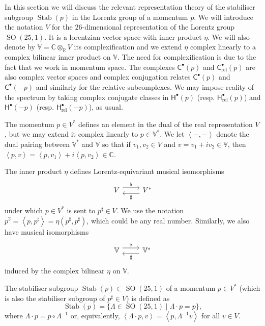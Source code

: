 \documentclass[11pt,reqno,a4paper,final]{amsart}
\theoremstyle{plain}
\theoremstyle{definition}
\newcommand{\sC}{\mathsf{C}}
\newcommand{\sH}{\mathsf{H}}
\newcommand{\Crel}{\mathsf{C}_{\mathrm{rel}}} %
\newcommand{\Hrel}{\mathsf{H}_{\mathrm{rel}}}
\newcommand{\Stab}{\operatorname{Stab}}
\newcommand{\VV}{\mathbb{V}}
\newcommand{\RR}{\mathbb{R}}
\newcommand{\CC}{\mathbb{C}}
\newcommand{\1}{\mathbb{1}}
\newcommand{\SO}{\operatorname{SO}}
\numberwithin{equation}{section}
\begin{document}
In this section we will discuss the relevant representation theory of
the stabiliser subgroup $\Stab(p)$ in the Lorentz group of a momentum
$p$.  We will introduce the notation $V$ for the $26$-dimensional
representation of the Lorentz group $\SO(25,1)$.  It is a lorentzian
vector space with inner product $\eta$.  We will also denote by $\VV =
\CC \otimes_\RR V$ its complexification and we extend $\eta$ complex
linearly to a complex bilinear inner product on $\VV$.  The need for
complexification is due to the fact that we work in momentum space.
The complexes $\sC^\bullet(p)$ and $\Crel^\bullet(p)$ are also complex
vector spaces and complex conjugation relates $\sC^\bullet(p)$ and
$\sC^\bullet(-p)$ and similarly for the relative subcomplexes.  We
may impose reality of the spectrum by taking complex conjugate classes
in $\sH^\bullet(p)$ (resp. $\Hrel^\bullet(p)$) and $\sH^\bullet(-p)$
(resp. $\Hrel^\bullet(-p)$), as usual.

The momentum $p \in V^*$ defines an element in the dual of the real
representation $V$, but we may extend it complex linearly to
$p \in \VV^*$.  We let $\left<-,-\right>$ denote the dual pairing
between $\VV^*$ and $\VV$ so that if $v_1, v_2 \in V$ and
$v = v_1 + i v_2 \in \VV$, then
$\left<p,v\right> = \left<p,v_1\right> + i \left<p,v_2\right> \in
\CC$.

The inner product $\eta$ defines
Lorentz-equivariant musical isomorphisms
\begin{equation}
  \label{eq:musical}
  \begin{tikzcd}
    V \arrow[r, shift left=0.4em,"\flat"] & V^* \arrow[l, shift left=0.4em,"\sharp"]
  \end{tikzcd}
\end{equation}
under which $p \in V^*$ is sent to $p^\sharp \in V$.  We use the
notation $p^2 = \left<p, p^\sharp\right> = \eta(p^\sharp,p^\sharp)$,
which could be any real number.  Similarly, we also have musical
isomorphisms
\begin{equation}
  \label{eq:musical-complex}
  \begin{tikzcd}
    \VV \arrow[r, shift left=0.4em,"\flat"] & \VV^* \arrow[l, shift left=0.4em,"\sharp"]
  \end{tikzcd}
\end{equation}
induced by the complex bilinear $\eta$ on $\VV$.

The stabiliser subgroup $\Stab(p) \subset \SO(25,1)$ of a momentum
$p\in V^*$ (which is also the stabiliser subgroup of $p^\sharp \in V$)
is defined as
\begin{equation}
   \Stab(p) = \{\Lambda \in \SO(25,1) \mid \Lambda \cdot p = p \},
 \end{equation}
 where $\Lambda \cdot p = p \circ \Lambda^{-1}$ or, equivalently,
 $\left<\Lambda \cdot p, v\right> = \left<p, \Lambda^{-1} v\right>$
 for all $v \in V$.
\end{document}

